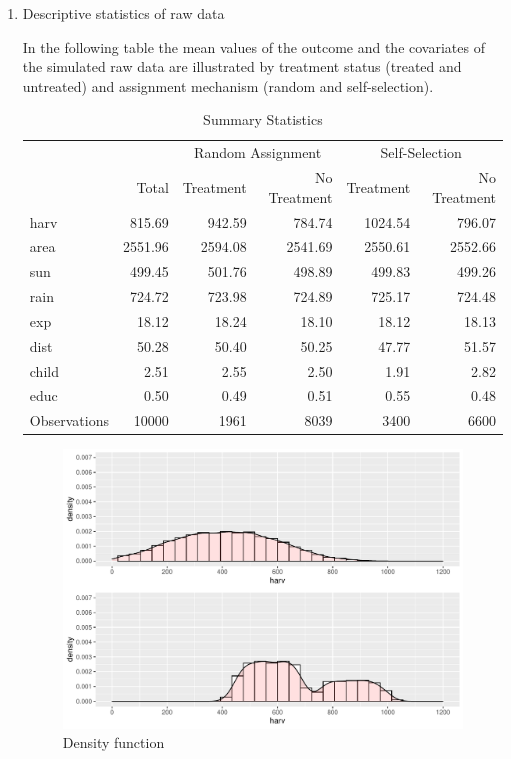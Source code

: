 \begin{enumerate}
\item Descriptive statistics of raw data

In the following table the mean values of the outcome and the covariates of the simulated raw data are illustrated by treatment status (treated and untreated) and assignment mechanism (random and self-selection). %

\begin{table}[ht]
\centering
\begin{threeparttable}
\caption{Summary Statistics} \label{tab:data}
\begin{tabular}{lrrrrr}
  \hline
  & &\multicolumn{2}{c}{Random Assignment} & \multicolumn{2}{c}{Self-Selection}\\
 & Total & Treatment & No Treatment & Treatment & No Treatment \\
 \hline
harv & 815.69 & 942.59 & 784.74 & 1024.54 & 796.07 \\ 
  area & 2551.96 & 2594.08 & 2541.69 & 2550.61 & 2552.66 \\ 
  sun & 499.45 & 501.76 & 498.89 & 499.83 & 499.26 \\ 
  rain & 724.72 & 723.98 & 724.89 & 725.17 & 724.48 \\ 
  exp & 18.12 & 18.24 & 18.10 & 18.12 & 18.13 \\ 
  dist & 50.28 & 50.40 & 50.25 & 47.77 & 51.57 \\ 
  child & 2.51 & 2.55 & 2.50 & 1.91 & 2.82 \\ 
  educ & 0.50 & 0.49 & 0.51 & 0.55 & 0.48 \\ 
  Observations & 10000 & 1961 & 8039 & 3400 & 6600 \\ 
   \hline
\end{tabular}
\end{threeparttable}
\end{table}

\begin{figure}[htb]
\begin{raggedleft}
\includegraphics[width=\linewidth]{../figures/density_total.pdf}
\caption{Density function}
\label{fig:density}
\end{raggedleft}
\end{figure}


\end{enumerate}
